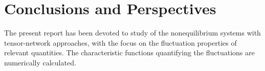 \chapter{Conclusions and Perspectives}


\par The present report has been devoted to study of the nonequilibrium systems with tensor-network approaches, with the focus on the fluctuation properties of relevant quantities. The characteristic functions quantifying the fluctuations are numerically calculated.















